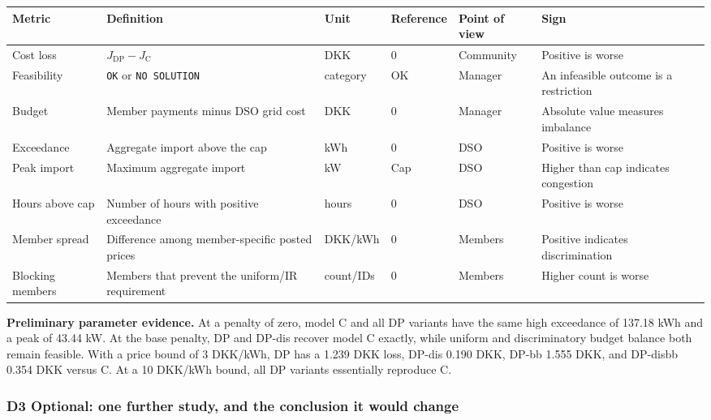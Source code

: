 \documentclass[]{article}
\begin{document}
\begin{longtable}[]{@{}llllll@{}}
\toprule
Metric & Definition & Unit & Reference & Point of view & Sign \\
\midrule
\endhead
Cost loss & \(J_{\mathrm{DP}}-J_{\mathrm C}\) & DKK & 0 & Community
& Positive is worse \\
Feasibility & \texttt{OK} or \texttt{NO SOLUTION} & category & OK
& Manager & An infeasible outcome is a restriction \\
Budget & Member payments minus DSO grid cost & DKK & 0 & Manager
& Absolute value measures imbalance \\
Exceedance & Aggregate import above the cap & kWh & 0 & DSO
& Positive is worse \\
Peak import & Maximum aggregate import & kW & Cap & DSO
& Higher than cap indicates congestion \\
Hours above cap & Number of hours with positive exceedance & hours
& 0 & DSO & Positive is worse \\
Member spread & Difference among member-specific posted prices
& DKK/kWh & 0 & Members & Positive indicates discrimination \\
Blocking members & Members that prevent the uniform/IR requirement
& count/IDs & 0 & Members & Higher count is worse \\
\bottomrule
\end{longtable}

\textbf{Preliminary parameter evidence.}
At a penalty of zero, model C and all DP variants have the same high
exceedance of 137.18 kWh and a peak of 43.44 kW. At the base penalty,
DP and DP-dis recover model C exactly, while uniform and discriminatory
budget balance both remain feasible. With a price bound of 3 DKK/kWh,
DP has a 1.239 DKK loss, DP-dis 0.190 DKK, DP-bb 1.555 DKK, and
DP-disbb 0.354 DKK versus C. At a 10 DKK/kWh bound, all DP variants
essentially reproduce C.

\subsubsection{D3 Optional: one further study, and the conclusion it
would change}
\label{d3-optional-one-further-study-and-the-conclusion-it-would-change}
\end{document}
